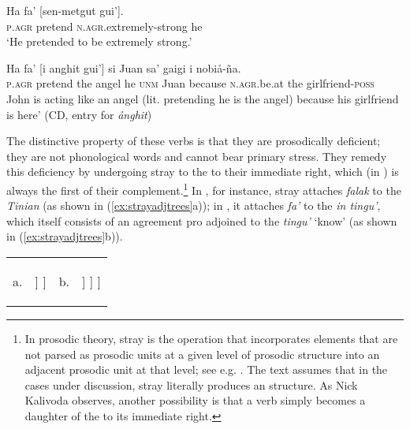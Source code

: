 \documentclass[output=paper,
modfonts
]{LSP/langsci}
\begin{document}
\begin{exe}
\begin{xlist}
\ex \label{ex:chung:22c} \gll Ha fa' {[}sen-metgut gui'{]}.\\
\textsc{p.agr} pretend \textsc{n.agr.}extremely-strong he\\
\glt `He pretended to be extremely strong.'

\ex \label{ex:chung:22d} \gll Ha fa' {[}i anghit gui'{]} si Juan sa' gaigi i nobiå-ña.\\
\textsc{p.agr} pretend the angel he \textsc{unm} Juan because
\textsc{n.agr.}be.at the girlfriend-\textsc{poss}\\
\glt John is acting like an angel (lit. pretending he is the angel) because
his girlfriend is here' (CD, entry for \emph{ånghit})
\z
\z

The distinctive property of these verbs is that they are prosodically
deficient; they are not phonological words and cannot bear primary
stress. They remedy this deficiency by undergoing stray  to
the  to their immediate right, which (in ) is
always the first  of their complement.\footnote{In
  prosodic theory, stray  is the operation that incorporates
  elements that are not parsed as prosodic units at a given level of
  prosodic structure into an adjacent prosodic unit at that level; see
  e.g. \citealt[13]{anderson2005}. The text assumes that in the cases under
  discussion, stray  literally produces an 
  structure. As Nick Kalivoda observes, another possibility is that a
   verb simply becomes a daughter of the
   to its immediate right.} In , for instance,
stray  attaches \emph{falak} to the 
\emph{Tinian} (as shown in (\ref{ex:strayadjtrees}a)); in , it attaches \emph{fa'} to
the  \emph{in tingu'}, which itself consists of an
agreement pro adjoined to the  \emph{tingu'}
`know' (as shown in (\ref{ex:strayadjtrees}b)).

\ea \label{ex:chung:23}
\begin{tabularx}{\linewidth-0.1em}[t]{lXlX}
	a. &
	\begin{forest}
		[ω
		[falak]
		[ω
		[Tinian]
		]
		]
	\end{forest} &
	b. &
	\begin{forest}
		[ω
		[fa']
		[ω
		[in]
		[ω
		[tingu']
		]
		]
		]
	\end{forest} \\	
\end{tabularx}\label{ex:strayadjtrees}
\z


\end{xlist}
\end{exe}
\end{document}
